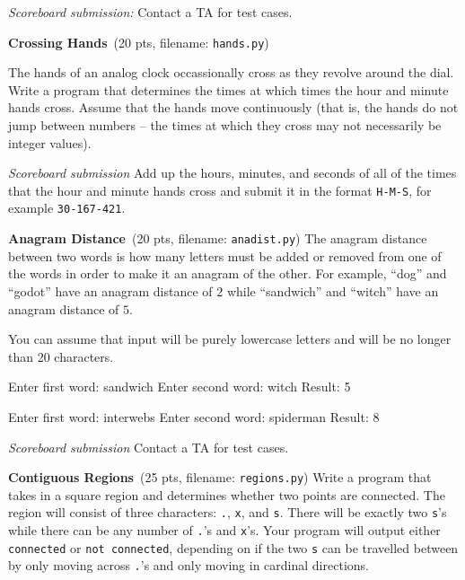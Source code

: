 \documentclass[11pt]{cselabheader}
\newcommand{\cop}[3]{\textbf{#1}~(#2 pts, filename: \texttt{#3})\quad}
\theoremstyle{plain}
\begin{document}
\begin{enumerate}
    \textit{Scoreboard submission:} Contact a TA for test cases.

  \item \cop{Crossing Hands}{20}{hands.py}

    The hands of an analog clock occassionally cross as they revolve around
    the dial. Write a program that determines the times at which times the 
    hour and minute hands cross. Assume that
    the hands move continuously (that is, the hands do not jump between
    numbers -- the times at which they cross may not necessarily be
    integer values).

    \textit{Scoreboard submission} Add up the hours, minutes, and seconds
    of all of the times that the hour and minute hands cross
    and submit it in the format \texttt{H-M-S}, 
    for example \texttt{30-167-421}.


  \item \cop{Anagram Distance}{20}{anadist.py}
    The anagram distance between two words is how many letters must be added
    or removed from one of the words in order to make it an anagram of the
    other. For example, ``dog'' and ``godot'' have an anagram distance of $2$
    while ``sandwich'' and ``witch'' have an anagram distance of $5$.

    You can assume that input will be purely lowercase letters and will be
    no longer than 20 characters.

    \begin{verbatimcode}
Enter first word: sandwich
Enter second word: witch
Result: 5
    \end{verbatimcode}

    \begin{verbatimcode}
Enter first word: interwebs
Enter second word: spiderman
Result: 8
    \end{verbatimcode}

    \textit{Scoreboard submission} Contact a TA for test cases.


  \item \cop{Contiguous Regions}{25}{regions.py}
    Write a program that takes in a square region and determines whether two
    points are connected. The region will consist of three characters: \texttt{.},
    \texttt{x}, and \texttt{s}. There will be exactly two \texttt{s}'s while there
    can be any number of \texttt{.}'s and \texttt{x}'s. Your program will output
    either \texttt{connected} or \texttt{not connected}, depending on if the two
    \texttt{s} can be travelled between by only moving across \texttt{.}'s and only
    moving in cardinal directions.


\end{enumerate}
\end{document}
